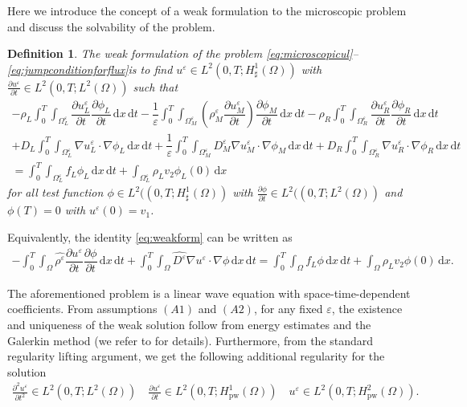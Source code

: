 \documentclass[11pt]{article}
\newtheorem{definition}{Definition}[section]
\def\es{\varepsilon}
\def\orr{\Omega_R^\varepsilon}
\def\omm{\Omega_M^\varepsilon}
\def\oll{\Omega_L^\varepsilon}
\def\p{\partial}
\newcommand{\di}[1]{\,\mathrm{d}#1}
\begin{document}
Here we introduce the concept of a weak formulation to the microscopic problem and discuss the solvability of the problem.
\begin{definition}
 The weak formulation of the problem \eqref{eq:microscopicul}--\eqref{eq:jumpconditionforflux}is to 
find $u^\es\in L^2(0,T;H_{\sharp}^1(\Omega))$ with $\frac{\partial u^\es}{\p t}\in L^2(0,T;L^2(\Omega))$ such that 
\begin{multline}\label{eq:weakform}
    -\rho_L\int_0^T\int_{\oll}  \dfrac{\partial u_L^\es}{\partial t}  \dfrac{\partial \phi_L}{\partial t}\di{x}\di{t}-  \dfrac{1}{\es} \int_0^T\int_{\omm}  \left({\rho_M^\es} \dfrac{\partial u_M^\es}{\partial t}\right) \dfrac{\partial \phi_M}{\partial t}\di{x}\di{t} -    \rho_R\int_0^T\int_{\orr} \dfrac{\partial u_R^\es}{\partial t}\dfrac{\partial \phi_R}{\partial t} \di{x}\di{t}\\
    +D_L\int_0^T\int_{\oll}\nabla u_L^\es \cdot \nabla \phi_L   \di{x}\di{t} +   \dfrac{1}{\es}\int_0^T\int_{\omm}  D_M^\es  \nabla u_M^\es\cdot\nabla \phi_M \di{x}\di{t}+D_R\int_0^T\int_{\orr} \nabla u_R^\es\cdot\nabla \phi_R \di{x} \di{t}
   \\
    = \int_0^T\int_{\oll} f_L\phi_L \di{x}\di{t}+\int_{\oll}\rho_L v_2\phi_L(0)\di{x}
\end{multline}
for all test function $\phi\in L^2((0,T;H^1_{\sharp}(\Omega))$ with $\frac{\p \phi}{\p t}\in L^2((0,T;L^2(\Omega))$ and $\phi(T)=0$ with $u^\es(0)=v_1$.
\end{definition}

Equivalently, the identity \eqref{eq:weakform} can be written as
\begin{multline*}
    -\int_0^T\int_\Omega \hat{\rho^\es}\dfrac{\partial u^\es}{\partial t}  \dfrac{\partial \phi}{\partial t}\di{x}\di{t}+\int_0^T\int_\Omega\hat{D^\es}\nabla u^\es \cdot \nabla\phi \di{x}\di{t}=\int_0^T\int_\Omega f_L\phi\di{x}\di{t}+\int_{\Omega}\rho_L v_2\phi(0)\di{x}.
\end{multline*}


 The aforementioned problem is a linear wave equation with space-time-dependent coefficients. From assumptions $(A1)$ and $(A2)$, for any fixed $\es$,  the existence and uniqueness of the weak solution follow from energy estimates and the Galerkin method (we refer to \cite{casado2011homogenization} for details). Furthermore, from the standard regularity lifting argument, we get the following additional regularity for the solution
 \begin{align*}
     \frac{\p^2 u^\es }{\p t^2}\in L^2(0,T;L^2(\Omega)) \quad \frac{\p u^\es }{\p t}\in L^2(0,T;H^1_{\text{pw}}(\Omega))\quad u^\es \in L^2(0,T;H^2_{\text{pw}}(\Omega)).
 \end{align*}
 
\end{document}
